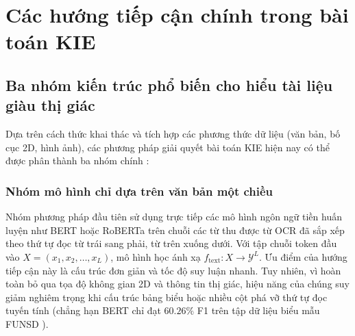 \section{Các hướng tiếp cận chính trong bài toán KIE}

\subsection{Ba nhóm kiến trúc phổ biến cho hiểu tài liệu giàu thị giác}
Dựa trên cách thức khai thác và tích hợp các phương thức dữ liệu (văn bản, bố cục 2D, hình ảnh), các phương pháp giải quyết bài toán KIE hiện nay có thể được phân thành ba nhóm chính \cite{cui2021document, phamthi2025dakta}:

\subsubsection{Nhóm mô hình chỉ dựa trên văn bản một chiều}
Nhóm phương pháp đầu tiên sử dụng trực tiếp các mô hình ngôn ngữ tiền huấn luyện như BERT \cite{devlin2019bert} hoặc RoBERTa trên chuỗi các từ thu được từ OCR đã sắp xếp theo thứ tự đọc từ trái sang phải, từ trên xuống dưới. Với tập chuỗi token đầu vào $X = (x_1, x_2, \dots, x_L)$, mô hình học ánh xạ $f_{\text{text}}: X \rightarrow \mathcal{Y}^L$. Ưu điểm của hướng tiếp cận này là cấu trúc đơn giản và tốc độ suy luận nhanh. Tuy nhiên, vì hoàn toàn bỏ qua tọa độ không gian 2D và thông tin thị giác, hiệu năng của chúng suy giảm nghiêm trọng khi cấu trúc bảng biểu hoặc nhiều cột phá vỡ thứ tự đọc tuyến tính (chẳng hạn BERT chỉ đạt $60.26\%$ F1 trên tập dữ liệu biểu mẫu FUNSD \cite{huang2022layoutlmv3}).

